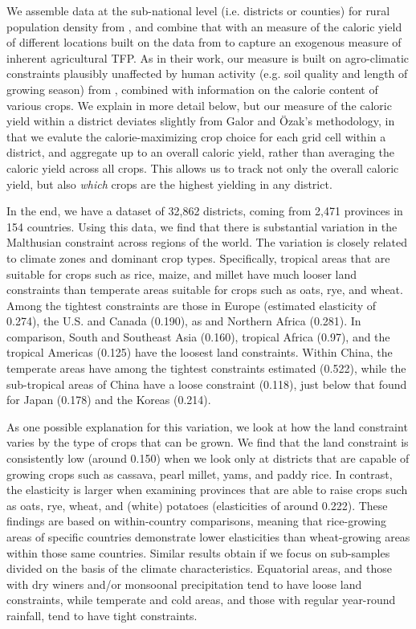 \documentclass[11pt]{article}
\begin{document}
We assemble data at the sub-national level (i.e. districts or counties) for rural population density from \citet{hyde31}, and combine that with an measure of the caloric yield of different locations built on the data from \citet{galorozak2016} to capture an exogenous measure of inherent agricultural TFP. As in their work, our measure is built on agro-climatic constraints plausibly unaffected by human activity (e.g. soil quality and length of growing season) from \citet{gaez}, combined with information on the calorie content of various crops. We explain in more detail below, but our measure of the caloric yield within a district deviates slightly from Galor and {\"O}zak's methodology, in that we evalute the calorie-maximizing crop choice for each grid cell within a district, and aggregate up to an overall caloric yield, rather than averaging the caloric yield across all crops. This allows us to track not only the overall caloric yield, but also \textit{which} crops are the highest yielding in any district.

In the end, we have a dataset of 32,862 districts, coming from 2,471 provinces in 154 countries. Using this data, we find that there is substantial variation in the Malthusian constraint across regions of the world. The variation is closely related to climate zones and dominant crop types. Specifically, tropical areas that are suitable for crops such as rice, maize, and millet have much looser land constraints than temperate areas suitable for crops such as oats, rye, and wheat. Among the tightest constraints are those in Europe (estimated elasticity of 0.274), the U.S. and Canada (0.190), as and Northern Africa (0.281). In comparison, South and Southeast Asia (0.160), tropical Africa (0.97), and the tropical Americas (0.125) have the loosest land constraints. Within China, the temperate areas have among the tightest constraints estimated (0.522), while the sub-tropical areas of China have a loose constraint (0.118), just below that found for Japan (0.178) and the Koreas (0.214). 

As one possible explanation for this variation, we look at how the land constraint varies by the type of crops that can be grown. We find that the land constraint is consistently low (around 0.150) when we look only at districts that are capable of growing crops such as cassava, pearl millet, yams, and paddy rice. In contrast, the elasticity is larger when examining provinces that are able to raise crops such as oats, rye, wheat, and (white) potatoes (elasticities of around 0.222). These findings are based on within-country comparisons, meaning that rice-growing areas of specific countries demonstrate lower elasticities than wheat-growing areas within those same countries. Similar results obtain if we focus on sub-samples divided on the basis of the climate characteristics. Equatorial areas, and those with dry winers and/or monsoonal precipitation tend to have loose land constraints, while temperate and cold areas, and those with regular year-round rainfall, tend to have tight constraints. 
\end{document}

